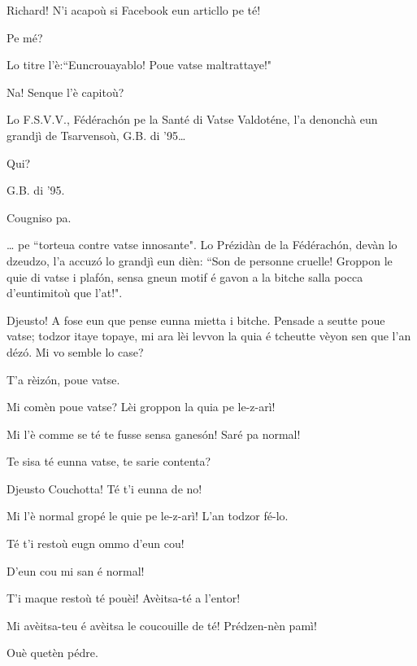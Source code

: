 \begin{drama}
\scene[-- G.B. di '95]

\Saventaspeaks Richard! N'i acapoù si Facebook eun articllo pe té!

\Richardspeaks Pe mé?

\Saventaspeaks Lo titre l'è:``Euncrouayablo! Poue vatse maltrattaye!"

\Gerominespeaks Na! Senque l'è capitoù?

\Saventaspeaks Lo F.S.V.V., Fédérach\'on pe la Santé di Vatse Valdoténe, l'a denonchà eun grandjì de Tsarvensoù, G.B. di '95\ldots

\Tuenospeaks Qui?

\Saventaspeaks G.B. di '95.

\Tuenospeaks Cougniso pa.

\Saventaspeaks{} \ldots
pe ``torteua contre vatse innosante". 
Lo Prézidàn de la Fédérach\'on, devàn lo dzeudzo, l'a accuz\'o lo grandjì  eun dièn: ``Son de personne cruelle! Groppon le quie di vatse i plaf\'on, sensa gneun motif é gavon a la bitche salla pocca d'euntimitoù que l'at!".

\Richardspeaks Djeusto! A fose eun que pense eunna mietta i bitche. Pensade a seutte poue vatse; todzor itaye topaye, mi ara lèi levvon la quia é tcheutte vèyon sen que l'an déz\'o. Mi vo semble lo case?

\Gerominespeaks T'a rèiz\'on, poue vatse.

\Tuenospeaks Mi comèn poue vatse? Lèi groppon la quia pe le-z-arì! 

\Richardspeaks Mi l'è comme se té te fusse sensa ganes\'on! Saré pa normal!

\Gerominespeaks{} Te sisa té eunna vatse, te sarie contenta?

\Richardspeaks Djeusto Couchotta! Té t'i eunna de no!

\Tuenospeaks Mi l'è normal gropé le quie pe le-z-arì! L'an todzor fé-lo.

\Richardspeaks Té t'i restoù eugn ommo d'eun cou!

\Tuenospeaks D'eun cou mi san é normal!

\Richardspeaks T'i maque restoù té pouèi! Avèitsa-té a l'entor!

\Tuenospeaks Mi avèitsa-teu é avèitsa le coucouille de té! Prédzen-nèn pamì!

\Richardspeaks Ouè quetèn pédre.




\end{drama}
